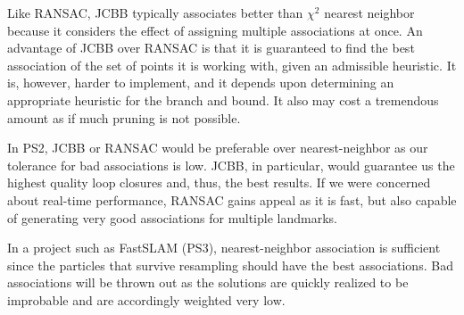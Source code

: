 \documentclass[12pt]{article}
\begin{document}
	Like RANSAC, JCBB typically associates better than $\chi^2$ nearest neighbor because it
considers the effect of assigning multiple associations at once.  An advantage of JCBB
over RANSAC is that it is guaranteed to find the best association of the set of points it is
working with, given an admissible heuristic.  It is, however, harder to implement, and it
depends upon determining an appropriate heuristic for the branch and bound. It also may cost
a tremendous amount as if much pruning is not possible.

In PS2, JCBB or RANSAC would be preferable over nearest-neighbor as our tolerance for
bad associations is low. JCBB, in particular, would guarantee us the highest quality
loop closures and, thus, the best results. If we were concerned about real-time performance,
RANSAC gains appeal as it is fast, but also capable of generating very good associations for
multiple landmarks.

In a project such as FastSLAM (PS3), nearest-neighbor association is sufficient since the
particles that survive resampling should have the best associations. Bad associations will
be thrown out as the solutions are quickly realized to be improbable and are accordingly
weighted very low.
\end{document}
